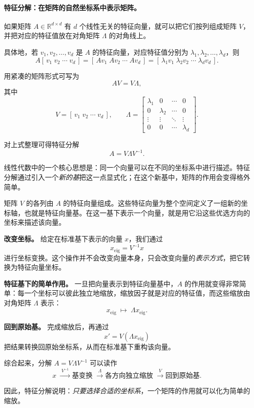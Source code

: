 \paragraph{特征分解：在矩阵的自然坐标系中表示矩阵。}
如果矩阵 \(A \in \mathbb{R}^{d \times d}\) 有 \(d\) 个线性无关的特征向量，就可以把它们按列组成矩阵 \(V\)，并把对应的特征值放在对角矩阵 \(\Lambda\) 的对角线上。

具体地，若 \(v_1, v_2, \dots, v_d\) 是 \(A\) 的特征向量，对应特征值分别为 \(\lambda_1, \lambda_2, \dots, \lambda_d\)，则
\[
A [\, v_1 \; v_2 \; \cdots \; v_d \,]
=
[\, A v_1 \; A v_2 \; \cdots \; A v_d \,]
=
[\, \lambda_1 v_1 \; \lambda_2 v_2 \; \cdots \; \lambda_d v_d \,].
\]

用紧凑的矩阵形式可写为
\[
A V = V \Lambda,
\]
其中
\[
V = [\, v_1 \; v_2 \; \cdots \; v_d \,],
\qquad
\Lambda =
\begin{bmatrix}
\lambda_1 & 0 & \cdots & 0 \\
0 & \lambda_2 & \cdots & 0 \\
\vdots & \vdots & \ddots & \vdots \\
0 & 0 & \cdots & \lambda_d
\end{bmatrix}.
\]

对上式整理可得特征分解
\[
A = V \Lambda V^{-1}.
\]

\begin{tcolorbox}[
  colback=blue!6,
  colframe=blue!55!black,
  title={直觉：把特征分解理解为基变换},
  boxrule=0.8pt,
  arc=2mm,
  left=2mm,
  right=2mm,
  top=1mm,
  bottom=1mm
]

线性代数中的一个核心思想是：同一个向量可以在不同的坐标系中进行描述。特征分解通过引入一个\emph{新的基}把这一点显式化；在这个新基中，矩阵的作用会变得格外简单。

矩阵 \(V\) 的各列由 \(A\) 的特征向量组成。这些特征向量为整个空间定义了一组新的坐标轴，也就是特征向量基。在这一基下表示一个向量，就是用它沿这些优选方向的坐标来描述该向量。

\medskip
\textbf{改变坐标。}
给定在标准基下表示的向量 \(x\)，我们通过
\[
x_{\text{eig}} = V^{-1} x
\]
进行坐标变换。这个操作并不会改变向量本身，只会改变向量的\emph{表示方式}，把它转换为特征向量坐标。

\medskip
\textbf{特征基下的简单作用。}
一旦把向量表示到特征向量基中，\(A\) 的作用就变得非常简单：每一个坐标可以彼此独立地缩放，缩放因子就是对应的特征值，而这些缩放由对角矩阵 \(\Lambda\) 表示：
\[
x_{\text{eig}} \;\mapsto\; \Lambda x_{\text{eig}}.
\]

\medskip
\textbf{回到原始基。}
完成缩放后，再通过
\[
x' = V(\Lambda x_{\text{eig}})
\]
把结果转换回原始坐标系，从而在标准基下重构该向量。

\medskip
综合起来，分解 \(A = V \Lambda V^{-1}\) 可以读作
\[
x
\;\xrightarrow{\;V^{-1}\;}
\text{基变换}
\;\xrightarrow{\;\Lambda\;}
\text{各方向独立缩放}
\;\xrightarrow{\;V\;}
\text{回到原始基}.
\]

因此，特征分解说明：\emph{只要选择合适的坐标系}，一个矩阵的作用就可以化为简单的缩放。
\end{tcolorbox}

